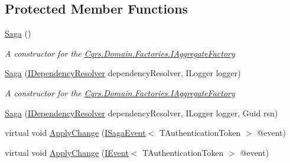 \subsection*{Protected Member Functions}
\begin{DoxyCompactItemize}
\item 
\hyperlink{classCqrs_1_1Domain_1_1Saga_a1b6019cecbbf2572b64dd456cb5d91a2}{Saga} ()
\begin{DoxyCompactList}\small\item\em A constructor for the \hyperlink{interfaceCqrs_1_1Domain_1_1Factories_1_1IAggregateFactory}{Cqrs.\+Domain.\+Factories.\+I\+Aggregate\+Factory} \end{DoxyCompactList}\item 
\hyperlink{classCqrs_1_1Domain_1_1Saga_affa39972d1946ab9f5d2474b17acbdd4}{Saga} (\hyperlink{interfaceCqrs_1_1Configuration_1_1IDependencyResolver}{I\+Dependency\+Resolver} dependency\+Resolver, I\+Logger logger)
\begin{DoxyCompactList}\small\item\em A constructor for the \hyperlink{interfaceCqrs_1_1Domain_1_1Factories_1_1IAggregateFactory}{Cqrs.\+Domain.\+Factories.\+I\+Aggregate\+Factory} \end{DoxyCompactList}\item 
\hyperlink{classCqrs_1_1Domain_1_1Saga_acba7142c5e3ad568a60dc365fb7e8733}{Saga} (\hyperlink{interfaceCqrs_1_1Configuration_1_1IDependencyResolver}{I\+Dependency\+Resolver} dependency\+Resolver, I\+Logger logger, Guid rsn)
\item 
virtual void \hyperlink{classCqrs_1_1Domain_1_1Saga_af8a1eddbadc8fc3fb69f18691f3b08ac}{Apply\+Change} (\hyperlink{interfaceCqrs_1_1Events_1_1ISagaEvent}{I\+Saga\+Event}$<$ T\+Authentication\+Token $>$ @event)
\item 
virtual void \hyperlink{classCqrs_1_1Domain_1_1Saga_a25462563492d834e297388e0648a57ac}{Apply\+Change} (\hyperlink{interfaceCqrs_1_1Events_1_1IEvent}{I\+Event}$<$ T\+Authentication\+Token $>$ @event)
\end{DoxyCompactItemize}

